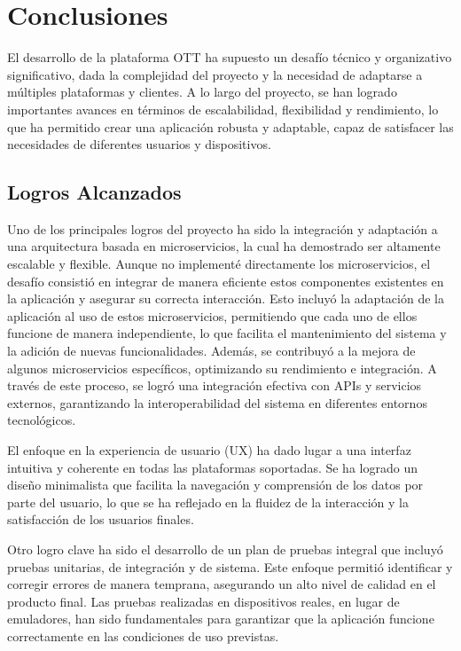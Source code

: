 \chapter{Conclusiones}
\label{chap:conclusiones}

El desarrollo de la plataforma OTT ha supuesto un desafío técnico y organizativo significativo, dada la complejidad del 
proyecto y la necesidad de adaptarse a múltiples plataformas y clientes. A lo largo del proyecto, se han logrado 
importantes avances en términos de escalabilidad, flexibilidad y rendimiento, lo que ha permitido crear una aplicación 
robusta y adaptable, capaz de satisfacer las necesidades de diferentes usuarios y dispositivos.

\section{Logros Alcanzados}
\label{sec:conclusiones:logros}

Uno de los principales logros del proyecto ha sido la integración y adaptación a una arquitectura basada en microservicios, 
la cual ha demostrado ser altamente escalable y flexible. Aunque no implementé directamente los microservicios, el 
desafío consistió en integrar de manera eficiente estos componentes existentes en la aplicación y asegurar su correcta 
interacción. Esto incluyó la adaptación de la aplicación al uso de estos microservicios, permitiendo que cada uno de 
ellos funcione de manera independiente, lo que facilita el mantenimiento del sistema y la adición de nuevas funcionalidades.
Además, se contribuyó a la mejora de algunos microservicios específicos, optimizando su rendimiento e integración. 
A través de este proceso, se logró una integración efectiva con APIs y servicios externos, garantizando la interoperabilidad 
del sistema en diferentes entornos tecnológicos.

El enfoque en la experiencia de usuario (UX) ha dado lugar a una interfaz intuitiva y coherente en todas las plataformas 
soportadas. Se ha logrado un diseño minimalista que facilita la navegación y comprensión de los datos por parte del usuario, 
lo que se ha reflejado en la fluidez de la interacción y la satisfacción de los usuarios finales.

Otro logro clave ha sido el desarrollo de un plan de pruebas integral que incluyó pruebas unitarias, de integración y de 
sistema. Este enfoque permitió identificar y corregir errores de manera temprana, asegurando un alto nivel de calidad 
en el producto final. Las pruebas realizadas en dispositivos reales, en lugar de emuladores, han sido fundamentales para 
garantizar que la aplicación funcione correctamente en las condiciones de uso previstas.

